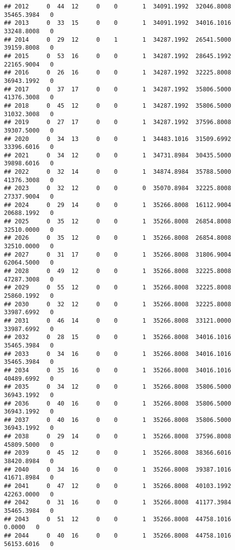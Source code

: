 \documentclass[
]{article}
\begin{document}
\begin{enumerate}
\begin{verbatim}
## 2012     0  44  12     0    0       1  34091.1992  32046.8008  35465.3984   0
## 2013     0  33  15     0    0       1  34091.1992  34016.1016  33248.8008   0
## 2014     0  29  12     0    1       1  34287.1992  26541.5000  39159.8008   0
## 2015     0  53  16     0    0       1  34287.1992  28645.1992  22165.9004   0
## 2016     0  26  16     0    0       1  34287.1992  32225.8008  36943.1992   0
## 2017     0  37  17     0    0       1  34287.1992  35806.5000  41376.3008   0
## 2018     0  45  12     0    0       1  34287.1992  35806.5000  31032.3008   0
## 2019     0  27  17     0    0       1  34287.1992  37596.8008  39307.5000   0
## 2020     0  34  13     0    0       1  34483.1016  31509.6992  33396.6016   0
## 2021     0  34  12     0    0       1  34731.8984  30435.5000  39898.6016   0
## 2022     0  32  14     0    0       1  34874.8984  35788.5000  41376.3008   0
## 2023     0  32  12     0    0       0  35070.8984  32225.8008  27337.9004   0
## 2024     0  29  14     0    0       1  35266.8008  16112.9004  20688.1992   0
## 2025     0  35  12     0    0       1  35266.8008  26854.8008  32510.0000   0
## 2026     0  35  12     0    0       1  35266.8008  26854.8008  32510.0000   0
## 2027     0  31  17     0    0       1  35266.8008  31806.9004  62064.5000   0
## 2028     0  49  12     0    0       1  35266.8008  32225.8008  47287.3008   0
## 2029     0  55  12     0    0       1  35266.8008  32225.8008  25860.1992   0
## 2030     0  32  12     0    0       1  35266.8008  32225.8008  33987.6992   0
## 2031     0  46  14     0    0       1  35266.8008  33121.0000  33987.6992   0
## 2032     0  28  15     0    0       1  35266.8008  34016.1016  35465.3984   0
## 2033     0  34  16     0    0       1  35266.8008  34016.1016  35465.3984   0
## 2034     0  35  16     0    0       1  35266.8008  34016.1016  40489.6992   0
## 2035     0  34  12     0    0       1  35266.8008  35806.5000  36943.1992   0
## 2036     0  40  16     0    0       1  35266.8008  35806.5000  36943.1992   0
## 2037     0  40  16     0    0       1  35266.8008  35806.5000  36943.1992   0
## 2038     0  29  14     0    0       1  35266.8008  37596.8008  45809.5000   0
## 2039     0  45  12     0    0       1  35266.8008  38366.6016  38420.8984   0
## 2040     0  34  16     0    0       1  35266.8008  39387.1016  41671.8984   0
## 2041     0  47  12     0    0       1  35266.8008  40103.1992  42263.0000   0
## 2042     0  31  16     0    0       1  35266.8008  41177.3984  35465.3984   0
## 2043     0  51  12     0    0       1  35266.8008  44758.1016      0.0000   0
## 2044     0  40  16     0    0       1  35266.8008  44758.1016  56153.6016   0

\end{verbatim}
\end{enumerate}
\end{document}
